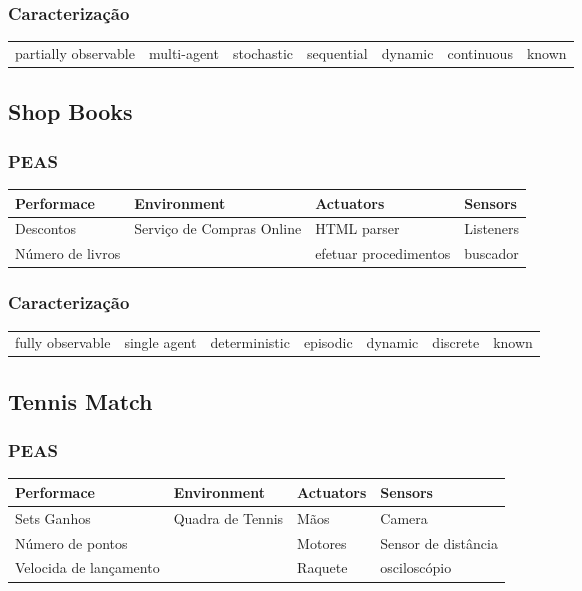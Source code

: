 \documentclass[a4paper,12pt]{article}
\begin{document}
\subsubsection{Caracterização}
\begin{table}[h!]
\begin{tabular}{|c|c|c|c|c|c|c|}
\hline
partially observable & multi-agent & stochastic & sequential & dynamic & continuous & known
\end{tabular}
\end{table}

\subsection{Shop Books}
\subsubsection{PEAS}
\begin{table}[h!]
\begin{tabular}{l|l|l|l}
\hline
Performace & Environment & Actuators & Sensors \\
\hline
Descontos & Serviço de Compras Online & HTML parser & Listeners \\
Número de livros & & efetuar procedimentos & buscador\\
\end{tabular}
\end{table}
\subsubsection{Caracterização}
\begin{table}[h!]
\begin{tabular}{|c|c|c|c|c|c|c|}
\hline
fully observable & single agent & deterministic & episodic & dynamic & discrete & known
\end{tabular}
\end{table}

\subsection{Tennis Match}
\subsubsection{PEAS}
\begin{table}[h!]
\begin{tabular}{l|l|l|l}
\hline
Performace & Environment & Actuators & Sensors \\
\hline
Sets Ganhos & Quadra de Tennis & Mãos & Camera \\
Número de pontos & & Motores & Sensor de distância\\
Velocida de lançamento & & Raquete & osciloscópio\\
\end{tabular}
\end{table}
\end{document}

